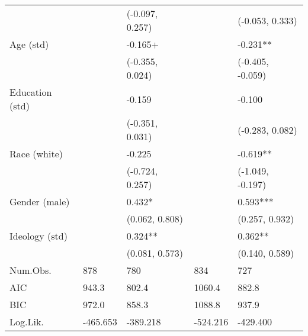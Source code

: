 \begin{table}[th!]
\begin{threeparttable}
\begin{tabular}{lC{3cm}C{3cm}C{3cm}C{3cm}}
                &                  &                  (-0.097, 0.257) &                       &                       (-0.053, 0.333) \\
      Age (std) &                  &                          -0.165+ &                       &                              -0.231** \\
                &                  &                  (-0.355, 0.024) &                       &                      (-0.405, -0.059) \\
Education (std) &                  &                           -0.159 &                       &                                -0.100 \\
                &                  &                  (-0.351, 0.031) &                       &                       (-0.283, 0.082) \\
   Race (white) &                  &                           -0.225 &                       &                              -0.619** \\
                &                  &                  (-0.724, 0.257) &                       &                      (-1.049, -0.197) \\
  Gender (male) &                  &                           0.432* &                       &                              0.593*** \\
                &                  &                   (0.062, 0.808) &                       &                        (0.257, 0.932) \\
 Ideology (std) &                  &                          0.324** &                       &                               0.362** \\
                &                  &                   (0.081, 0.573) &                       &                        (0.140, 0.589) \\
       Num.Obs. &              878 &                              780 &                   834 &                                   727 \\
            AIC &            943.3 &                            802.4 &                1060.4 &                                 882.8 \\
            BIC &            972.0 &                            858.3 &                1088.8 &                                 937.9 \\
       Log.Lik. &         -465.653 &                         -389.218 &              -524.216 &                              -429.400 \\

\end{tabular}
\end{threeparttable}
\end{table}

